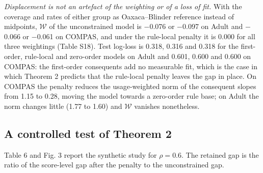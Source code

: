 \documentclass[pdflatex,sn-basic,Numbered,lineno]{sn-jnl}
\begin{document}
\emph{Displacement is not an artefact of the weighting or of a loss of fit.} With the coverage and rates of either group as Oaxaca--Blinder reference instead of midpoints, \(\mathcal W\) of the unconstrained model is \ensuremath{-}0.076 or \ensuremath{-}0.097 on Adult and \ensuremath{-}0.066 or \ensuremath{-}0.061 on COMPAS, and under the rule-local penalty it is 0.000 for all three weightings (Table S18). Test log-loss is 0.318, 0.316 and 0.318 for the first-order, rule-local and zero-order models on Adult and 0.601, 0.600 and 0.600 on COMPAS: the first-order consequents add no measurable fit, which is the case in which Theorem 2 predicts that the rule-local penalty leaves the gap in place. On COMPAS the penalty reduces the usage-weighted norm of the consequent slopes from 1.15 to 0.28, moving the model towards a zero-order rule base; on Adult the norm changes little (1.77 to 1.60) and \(\mathcal W\) vanishes nonetheless.

\hypertarget{a-controlled-test-of-theorem-2}{%
\subsection{A controlled test of Theorem 2}\label{a-controlled-test-of-theorem-2}}

Table 6 and Fig. 3 report the synthetic study for \(\rho = 0.6\). The retained gap is the ratio of the score-level gap after the penalty to the unconstrained gap.
\end{document}
